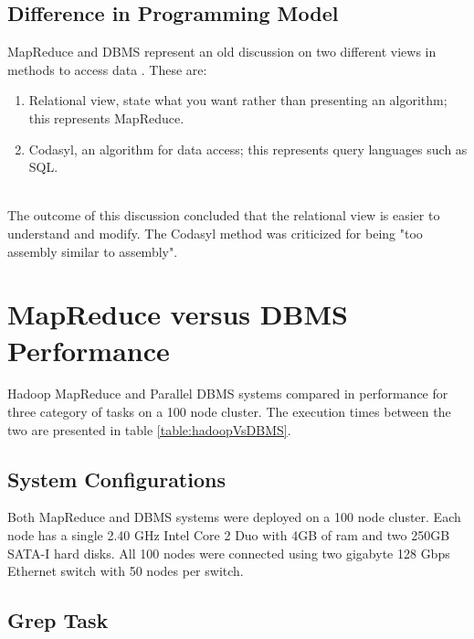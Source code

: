 \documentclass[10pt,twocolumn]{IEEEtran11}
\begin{document}
\subsection{Difference in Programming Model}
MapReduce and DBMS represent an old discussion on two different views in methods to access data \cite{pavlo2009comparison}.  These are:
\  \\
\begin{enumerate}
	\setlength\itemsep{1em}
	\item Relational view, state what you want rather than presenting an algorithm; this represents MapReduce.
	\item Codasyl, an algorithm for data access; this represents query languages such as SQL.
\end{enumerate} 
\  \\
The outcome of this discussion concluded that the relational view is easier to understand and modify. The Codasyl method was criticized for being "too assembly similar to assembly".  

\section{MapReduce versus DBMS Performance} \label{mrVSDBMSSection}

Hadoop MapReduce and Parallel DBMS systems compared in performance for three category of tasks on a 100 node cluster.  The execution times between the two are presented in table \ref{table:hadoopVsDBMS}.  

\subsection{System Configurations}
Both MapReduce and DBMS systems were deployed on a 100 node cluster.  Each node has a single 2.40 GHz Intel Core 2 Duo with 4GB of ram and two 250GB SATA-I hard disks.  All 100 nodes were connected using two gigabyte 128 Gbps Ethernet switch with 50 nodes per switch.

\subsection{Grep Task}
\end{document}
